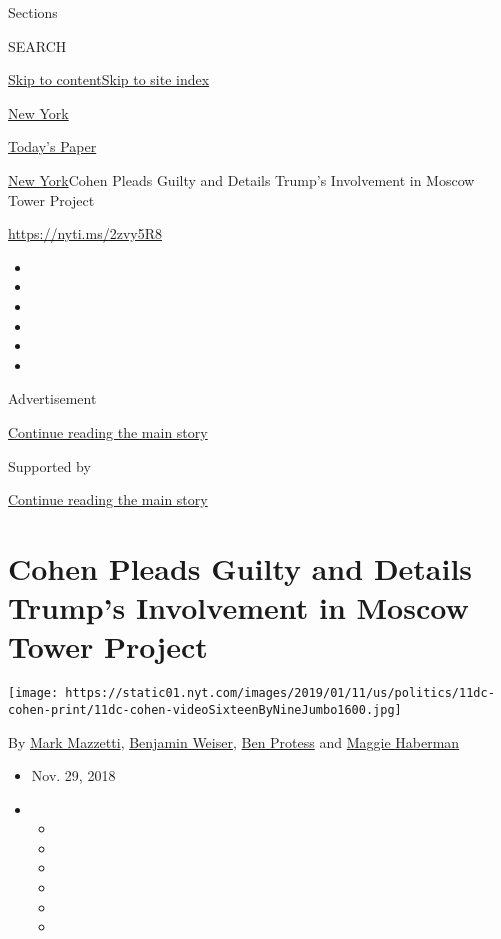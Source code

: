 Sections

SEARCH

\protect\hyperlink{site-content}{Skip to
content}\protect\hyperlink{site-index}{Skip to site index}

\href{https://www.nytimes.com/section/nyregion}{New York}

\href{https://myaccount.nytimes.com/auth/login?response_type=cookie\&client_id=vi}{}

\href{https://www.nytimes.com/section/todayspaper}{Today's Paper}

\href{/section/nyregion}{New York}\textbar{}Cohen Pleads Guilty and
Details Trump's Involvement in Moscow Tower Project

\url{https://nyti.ms/2zvy5R8}

\begin{itemize}
\item
\item
\item
\item
\item
\item
\end{itemize}

Advertisement

\protect\hyperlink{after-top}{Continue reading the main story}

Supported by

\protect\hyperlink{after-sponsor}{Continue reading the main story}

\hypertarget{cohen-pleads-guilty-and-details-trumps-involvement-in-moscow-tower-project}{%
\section{Cohen Pleads Guilty and Details Trump's Involvement in Moscow
Tower
Project}\label{cohen-pleads-guilty-and-details-trumps-involvement-in-moscow-tower-project}}

\texttt{[image: https://static01.nyt.com/images/2019/01/11/us/politics/11dc-cohen-print/11dc-cohen-videoSixteenByNineJumbo1600.jpg]}

By \href{https://www.nytimes.com/by/mark-mazzetti}{Mark Mazzetti},
\href{https://www.nytimes.com/by/benjamin-weiser}{Benjamin Weiser},
\href{https://www.nytimes.com/by/ben-protess}{Ben Protess} and
\href{https://www.nytimes.com/by/maggie-haberman}{Maggie Haberman}

\begin{itemize}
\item
  Nov. 29, 2018
\item
  \begin{itemize}
  \item
  \item
  \item
  \item
  \item
  \item
  \end{itemize}
\end{itemize}

